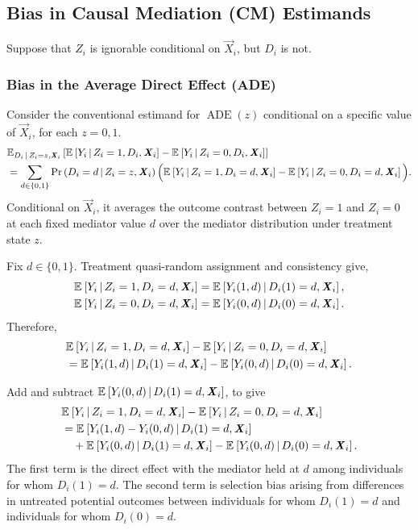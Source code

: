 \subsection{Bias in Causal Mediation (CM) Estimands}
\label{appendix:mediation-bias}
Suppose that $Z_i$ is ignorable conditional on $\vec X_i$, but $D_i$ is not.


\subsubsection{Bias in the Average Direct Effect (ADE)}
Consider the conventional estimand for $\operatorname{ADE}(z)$
conditional on a specific value of $\vec X_i$, for each $z=0,1$.
\begin{align*}
    & \E[D_i \,\mid\, Z_i=z, \vec X_i]{
        \Egiven{Y_i}{Z_i=1,D_i,\vec X_i} -
        \Egiven{Y_i}{Z_i=0,D_i,\vec X_i} } \\
    &=
    \sum_{d \in \{0,1\}}
    \Probgiven{D_i=d}{Z_i=z,\vec X_i}
    \Big(
        \Egiven{Y_i}{Z_i=1,D_i=d,\vec X_i}
        -
        \Egiven{Y_i}{Z_i=0,D_i=d,\vec X_i}
    \Big).
\end{align*}
Conditional on $\vec X_i$, it averages the outcome contrast between $Z_i=1$ and $Z_i=0$ at each fixed mediator value $d$ over the mediator distribution under treatment state $z$.

Fix $d \in \{0,1\}$.
Treatment quasi-random assignment and consistency give,
\begin{align*}
    \Egiven{Y_i}{Z_i=1,D_i=d,\vec X_i}
    &=
    \Egiven{Y_i(1,d)}{D_i(1)=d,\vec X_i},
    \\
    \Egiven{Y_i}{Z_i=0,D_i=d,\vec X_i}
    &=
    \Egiven{Y_i(0,d)}{D_i(0)=d,\vec X_i}.
\end{align*}
Therefore,
\begin{align*}
    &\Egiven{Y_i}{Z_i=1,D_i=d,\vec X_i}
    -
    \Egiven{Y_i}{Z_i=0,D_i=d,\vec X_i}
    \\
    &=
    \Egiven{Y_i(1,d)}{D_i(1)=d,\vec X_i}
    -
    \Egiven{Y_i(0,d)}{D_i(0)=d,\vec X_i}.
\end{align*}

Add and subtract
$\Egiven{Y_i(0,d)}{D_i(1)=d,\vec X_i}$, to give
\begin{align*}
    &\Egiven{Y_i}{Z_i=1,D_i=d,\vec X_i}
    -
    \Egiven{Y_i}{Z_i=0,D_i=d,\vec X_i}
    \\
    &=
    \Egiven{Y_i(1,d)-Y_i(0,d)}
        {D_i(1)=d,\vec X_i}
    \\
    &\quad+
        \Egiven{Y_i(0,d)}
            {D_i(1)=d,\vec X_i}
        -
        \Egiven{Y_i(0,d)}
            {D_i(0)=d,\vec X_i}.
\end{align*}
The first term is the direct effect with the mediator held at $d$ among individuals for whom $D_i(1)=d$.
The second term is selection bias arising from differences in untreated potential outcomes between individuals for whom $D_i(1)=d$ and individuals for whom $D_i(0)=d$.

